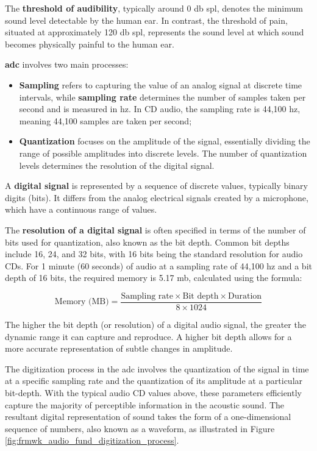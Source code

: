 The \textbf{threshold of audibility}, typically around 0 \gls{db} \gls{spl}, denotes the minimum sound level detectable by the human ear. In contrast, the threshold of pain, situated at approximately 120 \gls{db} \gls{spl}, represents the sound level at which sound becomes physically painful to the human ear. 

\textbf{\gls{adc}} involves two main processes: 
\begin{itemize}
    \item \textbf{Sampling} refers to capturing the value of an analog signal at discrete time intervals, while \textbf{sampling rate} determines the number of samples taken per second and is measured in \gls{hz}. In CD audio, the sampling rate is 44,100 \gls{hz}, meaning 44,100 samples are taken per second;
    \item \textbf{Quantization} focuses on the amplitude of the signal, essentially dividing the range of possible amplitudes into discrete levels. The number of quantization levels determines the resolution of the digital signal.
\end{itemize}

A \textbf{digital signal} is represented by a sequence of discrete values, typically binary digits (bits). It differs from the analog electrical signals created by a microphone, which have a continuous range of values.

The \textbf{resolution of a digital signal} is often specified in terms of the number of bits used for quantization, also known as the bit depth. Common bit depths include 16, 24, and 32 bits, with 16 bits being the standard resolution for audio CDs. For 1 minute (60 seconds) of audio at a sampling rate of 44,100 \gls{hz} and a bit depth of 16 bits, the required memory is 5.17 \gls{m}\gls{b}, calculated using the formula: 

\begin{equation}
    \label{eq:frmwk_audio_fund_audio_memory_calculation}
\text{Memory (MB)} = \frac{\text{Sampling rate} \times \text{Bit depth} \times \text{Duration}}{8 \times 1024}
\end{equation}

The higher the bit depth (or resolution) of a digital audio signal, the greater the dynamic range it can capture and reproduce. A higher bit depth allows for a more accurate representation of subtle changes in amplitude.

The digitization process in the \gls{adc} involves the quantization of the signal in time at a specific sampling rate and the quantization of its amplitude at a particular bit-depth. With the typical audio CD values above, these parameters efficiently capture the majority of perceptible information in the acoustic sound. The resultant digital representation of sound takes the form of a one-dimensional sequence of numbers, also known as a waveform, as illustrated in Figure \ref{fig:frmwk_audio_fund_digitization_process}.


